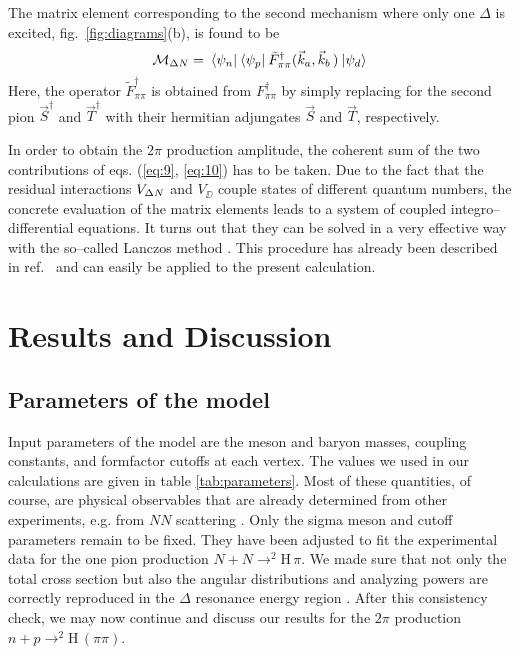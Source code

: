 The matrix element corresponding to the second mechanism where only one
$\Delta$ is excited, fig.\ \ref{fig:diagrams}(b), is found to be
%
\begin{equation}
  \label{eq:10}
  {\mathcal M}_{\Delta N} = \: \langle \psi_n | \: \langle \psi_p | 
  \: \tilde F^\dagger_{\pi\pi} (\vec k_a, \vec k_b \,) 
  \: | \psi_d \rangle
\end{equation}
%
Here, the operator $\tilde F^\dagger_{\pi\pi}$ is obtained from 
$F^\dagger_{\pi\pi}$ by simply replacing for the second pion 
$\vec S^\dagger$ and $\vec T^\dagger$ with their hermitian adjungates 
$\vec S$ and $\vec T$, respectively.

In order to obtain the $2\pi$ production amplitude, the coherent 
sum of the two contributions of eqs. (\ref{eq:9}, \ref{eq:10}) has to be 
taken. Due to the fact that the residual interactions $V_{\Delta N}$ and $V_\DD$
couple states of different quantum numbers, the concrete evaluation
of the matrix elements leads to a system of coupled integro--differential
equations. It turns out that they can be solved in a very effective
way with the so--called Lanczos method \cite{whitehead77}. This
procedure has already been described in ref.\ \cite{udagawa94} 
and can easily be applied to the present calculation.




\section{Results and Discussion}
\label{sec:2}

\subsection{Parameters of the model}


Input parameters of the model are the meson and baryon masses, coupling 
constants, and formfactor cutoffs at each vertex. The values we used in our 
calculations are given in table \ref{tab:parameters}. 
Most of these quantities, of course, are physical observables that 
are already determined from other experiments, e.g. from $NN$ scattering
\cite{dumbrajs83}. 
Only the sigma meson and cutoff parameters remain to be fixed.
They have been adjusted to fit the experimental data for the one pion 
production $N+N \to ^2$H$ \, \pi$. 
We made sure that not only the total cross section but also
the angular distributions and analyzing powers are correctly reproduced 
in the $\Delta$ resonance energy region \cite{mosbacher98a}. After this consistency check, 
we may now continue and discuss our results for the $2\pi$ production 
$n+p \to ^2$H$\, (\pi\pi)$.



